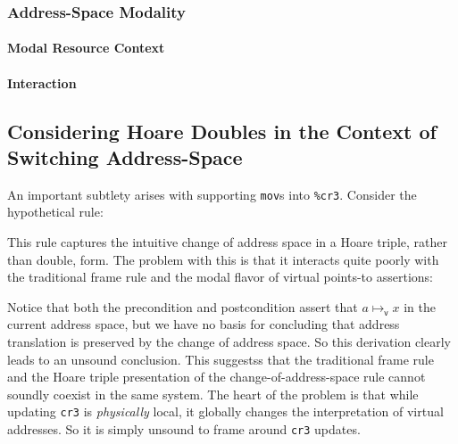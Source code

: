 \subsubsection{Address-Space Modality}
\label{sec:aspacemodalist}
\paragraph{Modal Resource Context}
\label{sec:resourcecontext}
\paragraph{Interaction}
\label{sec:interaction}
\subsection{Considering Hoare Doubles in the Context of Switching Address-Space}
An important subtlety arises with supporting \lstinline|mov|s into \lstinline|%cr3|. Consider the hypothetical rule:
\begin{mathpar}
\end{mathpar}
This rule captures the intuitive change of address space in a Hoare triple, rather than double, form. The problem with this is that it interacts quite poorly with the traditional frame rule and the modal flavor of virtual points-to assertions:
\begin{mathpar}
\end{mathpar}
Notice that both the precondition and postcondition assert that $a\mapsto_\mathsf{v} x$ in the current address space, but we have no basis for concluding that address translation is preserved by the change of address space. So this derivation clearly leads to an unsound conclusion. This suggestss that the traditional frame rule and the Hoare triple presentation of the change-of-address-space rule cannot soundly coexist in the same system.
The heart of the problem is that while updating \lstinline|cr3| is \emph{physically} local, it globally changes the interpretation of virtual addresses. So it is simply unsound to frame around \lstinline|cr3| updates.

